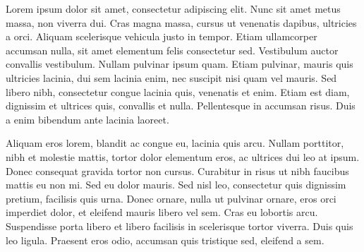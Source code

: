 \documentclass[a4paper,10pt]{report}
\begin{document}
 
 
 Lorem ipsum dolor sit amet, consectetur adipiscing elit. Nunc sit amet metus massa, non viverra dui. Cras magna massa, cursus ut venenatis dapibus, ultricies a orci. Aliquam scelerisque vehicula justo in tempor. Etiam ullamcorper accumsan nulla, sit amet elementum felis consectetur sed. Vestibulum auctor convallis vestibulum. Nullam pulvinar ipsum quam. Etiam pulvinar, mauris quis ultricies lacinia, dui sem lacinia enim, nec suscipit nisi quam vel mauris. Sed libero nibh, consectetur congue lacinia quis, venenatis et enim. Etiam est diam, dignissim et ultrices quis, convallis et nulla. Pellentesque in accumsan risus. Duis a enim bibendum ante lacinia laoreet.

Aliquam eros lorem, blandit ac congue eu, lacinia quis arcu. Nullam porttitor, nibh et molestie mattis, tortor dolor elementum eros, ac ultrices dui leo at ipsum. Donec consequat gravida tortor non cursus. Curabitur in risus ut nibh faucibus mattis eu non mi. Sed eu dolor mauris. Sed nisl leo, consectetur quis dignissim pretium, facilisis quis urna. Donec ornare, nulla ut pulvinar ornare, eros orci imperdiet dolor, et eleifend mauris libero vel sem. Cras eu lobortis arcu. Suspendisse porta libero et libero facilisis in scelerisque tortor viverra. Duis quis leo ligula. Praesent eros odio, accumsan quis tristique sed, eleifend a sem.
 
\end{document}
